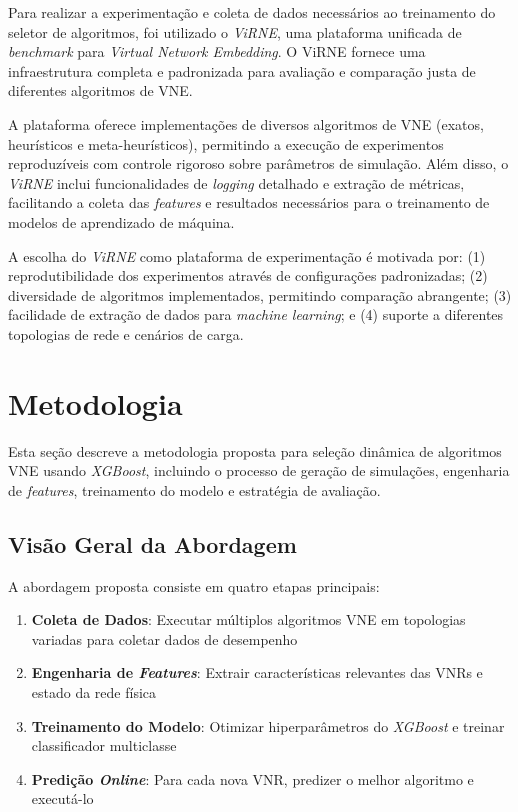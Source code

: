 \documentclass[conference]{IEEEtran}
\begin{document}
Para realizar a experimentação e coleta de dados necessários ao treinamento do seletor de algoritmos, foi utilizado o \textit{ViRNE}\cite{virne}, uma plataforma unificada de \textit{benchmark} para \textit{Virtual Network Embedding}.
O ViRNE fornece uma infraestrutura completa e padronizada para avaliação e comparação justa de diferentes algoritmos de VNE.

A plataforma oferece implementações de diversos algoritmos de VNE (exatos, heurísticos e meta-heurísticos), permitindo a execução de experimentos reproduzíveis com controle rigoroso sobre parâmetros de simulação.
Além disso, o \textit{ViRNE} inclui funcionalidades de \textit{logging} detalhado e extração de métricas, facilitando a coleta das \textit{features} e resultados necessários para o treinamento de modelos de aprendizado de máquina.

A escolha do \textit{ViRNE} como plataforma de experimentação é motivada por: (1) reprodutibilidade dos experimentos através de configurações padronizadas; (2) diversidade de algoritmos implementados, permitindo comparação abrangente; (3) facilidade de extração de dados para \textit{machine learning}; e (4) suporte a diferentes topologias de rede e cenários de carga.

\section{Metodologia}
\label{sec:Proposal}

Esta seção descreve a metodologia proposta para seleção dinâmica de algoritmos VNE usando \textit{XGBoost}, incluindo o processo de geração de simulações, engenharia de \textit{features}, treinamento do modelo e estratégia de avaliação.

\subsection{Visão Geral da Abordagem}

A abordagem proposta consiste em quatro etapas principais:

\begin{enumerate}
    \item \textbf{Coleta de Dados}: Executar múltiplos algoritmos VNE em topologias variadas para coletar dados de desempenho
    \item \textbf{Engenharia de \textit{Features}}: Extrair características relevantes das VNRs e estado da rede física
    \item \textbf{Treinamento do Modelo}: Otimizar hiperparâmetros do \textit{XGBoost} e treinar classificador multiclasse
    \item \textbf{Predição \textit{Online}}: Para cada nova VNR, predizer o melhor algoritmo e executá-lo
\end{enumerate}
\end{document}
